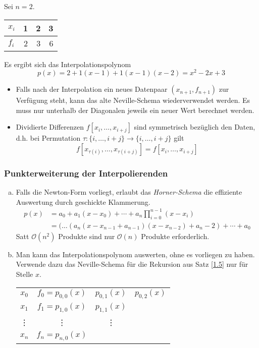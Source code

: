 \documentclass[11pt]{scrartcl}
\begin{document}
\begin{ex*}
	Sei $n=2$.	
	\begin{tabular}{l|rrr}
		$x_i$ & 1 & 2 & 3  \\ \hline
		$f_i$ & 2 & 3 & 6 
	\end{tabular}
	
	Es ergibt sich das Interpolationspolynom
	\[
		p(x) = 2+ 1(x-1) + 1(x-1)(x-2) = x^2 -2x+3
	\]
\end{ex*}

\begin{note}
	\begin{itemize}
		\item Falls nach der Interpolation ein neues Datenpaar $(x_{n+1},f_{n+1})$ zur Verfügung steht, kann das alte Neville-Schema wiederverwendet werden.
			Es muss nur unterhalb der Diagonalen jeweils ein neuer Wert berechnet werden.
		\item
			Dividierte Differenzen $f[x_i,\dotsc,x_{i+j}]$ sind symmetrisch bezüglich den Daten, d.h. bei Permutation $\tau: \{i,\dotsc,i+j\} \to \{i,\dotsc,i+j\}$ gilt
			\[
				f[x_{\tau(i)},\dotsc,x_{\tau(i+j)}] = f[x_i,\dotsc,x_{i+j}]
			\]
	\end{itemize}
\end{note}

\subsubsection{Punkterweiterung der Interpolierenden}

\begin{enumerate}[a)]
	\item 
		Falls die Newton-Form vorliegt, erlaubt das \emph{Horner-Schema} die effiziente Auswertung durch geschickte Klammerung.
		\begin{align*}
			p(x) &= a_0 + a_1(x-x_0) + \dotsb + a_n\prod_{i=0}^{n-1}(x-x_i)\\
				&= (\dotso(a_n(x-x_{n-1} + a_{n-1})(x-x_{n-2}) + a_n-2) + \dotsb + a_0
		\end{align*}
		Satt $\mathcal O(n^2)$ Produkte sind nur  $\mathcal O(n)$ Produkte erforderlich.
	\item
		Man kann das Interpolationspolynom auswerten, ohne es vorliegen zu haben.
		Verwende dazu das Neville-Schema für die Rekursion aus Satz \ref{1.5} nur für Stelle $x$.
		\begin{table}[!ht]
		\begin{tabular}{cccc}
		$x_0$ & $f_0=p_{0,0}(x)$ & $p_{0,1}(x)$ & $p_{0,2}(x)$ \\
		$x_1$ & $f_1=p_{1,0}(x)$ & $p_{1,1}(x)$ &  \\
		\vdots & \vdots & \vdots\\
		$x_n$ & $f_n=p_{n,0}(x)$ &\\
		\end{tabular}
		\end{table}
\end{enumerate}
\end{document}

